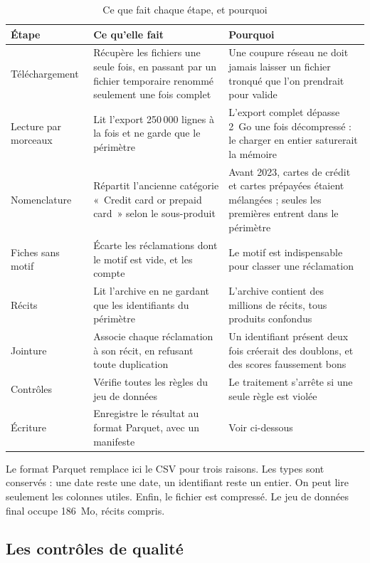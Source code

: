 \documentclass[11pt,a4paper]{article}
\begin{document}
\begin{table}[H]
\centering\small
\begin{tabularx}{\linewidth}{@{}l Y Y@{}}
\toprule
Étape & Ce qu'elle fait & Pourquoi \\
\midrule
Téléchargement & Récupère les fichiers une seule fois, en passant par un fichier temporaire renommé seulement une fois complet & Une coupure réseau ne doit jamais laisser un fichier tronqué que l'on prendrait pour valide \\
Lecture par morceaux & Lit l'export 250\,000 lignes à la fois et ne garde que le périmètre & L'export complet dépasse 2~Go une fois décompressé : le charger en entier saturerait la mémoire \\
Nomenclature & Répartit l'ancienne catégorie «~Credit card or prepaid card~» selon le sous-produit & Avant 2023, cartes de crédit et cartes prépayées étaient mélangées ; seules les premières entrent dans le périmètre \\
Fiches sans motif & Écarte les réclamations dont le motif est vide, et les compte & Le motif est indispensable pour classer une réclamation \\
Récits & Lit l'archive en ne gardant que les identifiants du périmètre & L'archive contient des millions de récits, tous produits confondus \\
Jointure & Associe chaque réclamation à son récit, en refusant toute duplication & Un identifiant présent deux fois créerait des doublons, et des scores faussement bons \\
Contrôles & Vérifie toutes les règles du jeu de données & Le traitement s'arrête si une seule règle est violée \\
Écriture & Enregistre le résultat au format Parquet, avec un manifeste & Voir ci-dessous \\
\bottomrule
\end{tabularx}
\caption{Ce que fait chaque étape, et pourquoi}
\end{table}

Le format Parquet remplace ici le CSV pour trois raisons. Les types sont conservés : une date reste une date, un identifiant reste un entier. On peut lire seulement les colonnes utiles. Enfin, le fichier est compressé. Le jeu de données final occupe 186~Mo, récits compris.

\subsection{Les contrôles de qualité}
\end{document}
